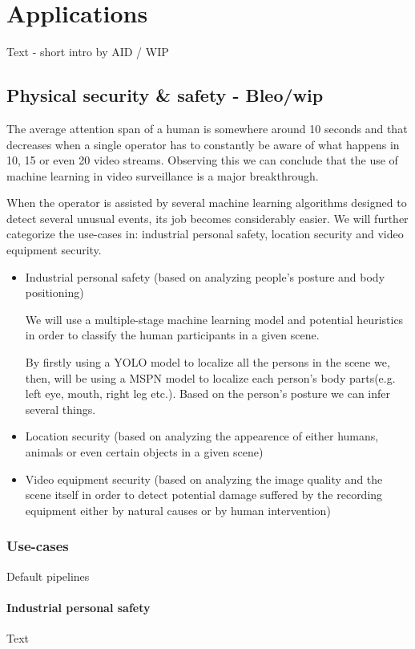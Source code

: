 \documentclass{article}
\begin{document}
\section{Applications}

Text - short intro by AID / WIP

\subsection{Physical security \& safety - Bleo/wip}
The average attention span of a human is somewhere around 10 seconds and that decreases when a single operator has to constantly be aware of what happens in 10, 15 or even 20 video streams. Observing this we can conclude that the use of machine learning in video surveillance is a major breakthrough.
		    
When the operator is assisted by several machine learning algorithms designed to detect several unusual events, its job becomes considerably easier.
We will further categorize the use-cases in: industrial personal safety, location security and video equipment security.

\begin{itemize}
    \item {Industrial personal safety (based on analyzing people's posture and body positioning)

    We will use a multiple-stage machine learning model and potential heuristics in order to classify the human participants in a given scene.
    }
    By firstly using a YOLO model to localize all the persons in the scene we, then, will be using a MSPN model to localize each person's body parts(e.g. left eye, mouth, right leg etc.).
    Based on the person's posture we can infer several things.
    \item {Location security (based on analyzing the appearence of either humans, animals or even certain objects in a given scene)}
    \item {Video equipment security (based on analyzing the image quality and the scene itself in order to detect potential damage suffered by the recording equipment either by natural causes or by human intervention)}

\end{itemize}
    \subsubsection{Use-cases}
    Default pipelines
        \paragraph{Industrial personal safety}
        Text
\end{document}
